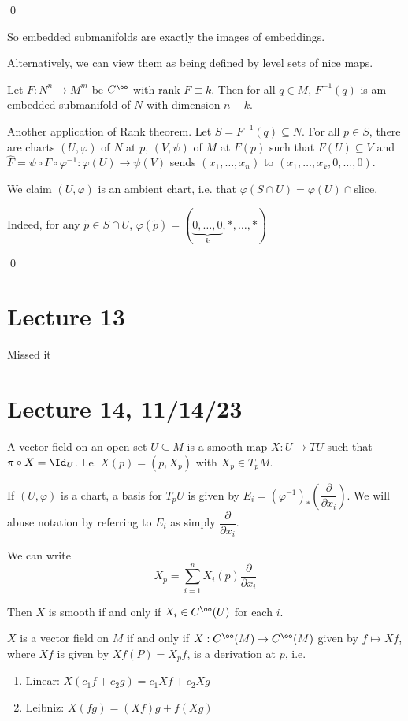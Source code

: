 \documentclass[x11names,reqno,14pt]{extarticle}
\newcommand{\pp}[2]{\dfrac{\partial #1}{\partial #2}}
\renewcommand{\phi}{\varphi}
\begin{document}
\qed

So embedded submanifolds are exactly the images of embeddings. 

Alternatively, we can view them as being defined by level sets of nice maps. 


Let $F:N^n\to M^m$ be $C^\oo$ with rank $F \equiv k$. Then for all $q \in M$, $F^{-1}(q)$ is am embedded submanifold of $N$ with dimension $n - k$.

\proof

Another application of Rank theorem. Let $S = F^{-1}(q) \subseteq N$. For all $p \in S$, there are charts $(U, \phi)$ of $N$ at $p$, $(V, \psi)$ of $M$ at $F(p)$ such that $F(U) \subseteq V$ and $\hat{F} = \psi\circ F \circ \phi^{-1}:\phi(U)\to \psi(V)$ sends $(x_1, \dots, x_n)$ to $(x_1, \dots, x_k, 0, \dots, 0)$.

We claim $(U, \phi)$ is an ambient chart, i.e. that $\phi(S\cap U) = \phi(U) \cap $slice. 

Indeed, for any $\tilde{p}\in S\cap U$, $\phi(\tilde{p}) = (\underbrace{0, \dots, 0}_{k}, *, \dots, *)$

\qed

\section*{Lecture 13}

Missed it

\section*{Lecture 14, 11/14/23}


A \underline{vector field} on an open set $U \subseteq M$ is a smooth map $X:U\to TU$ such that $\pi \circ X = \Id_U$. I.e. $X(p) = (p, X_p)$ with $X_p \in T_pM$. 

If $(U, \phi)$ is a chart, a basis for $T_pU$ is given by $E_i = (\phi^{-1})_*\left(\pp{}{x_i}\right)$. We will abuse notation by referring to $E_i$ as simply $\pp{}{x_i}$. 

We can write 
\[
X_p = \sum_{i=1}^n X_i(p)\pp{}{x_i}
\]

Then $X$ is smooth if and only if $X_i \in C^\oo(U)$ for each $i$. 

\prop

$X$ is a vector field on $M$ if and only if $X:C^\oo(M)\to C^\oo(M)$ given by $f \mapsto Xf$, where $Xf$ is given by $Xf(P) = X_pf$, is a derivation at $p$, i.e. 
\begin{enumerate}

\item Linear: $X(c_1f + c_2g) = c_1Xf + c_2Xg$

\item Leibniz: $X(fg) = (Xf)g + f(Xg)$

\end{enumerate}
\end{document}
